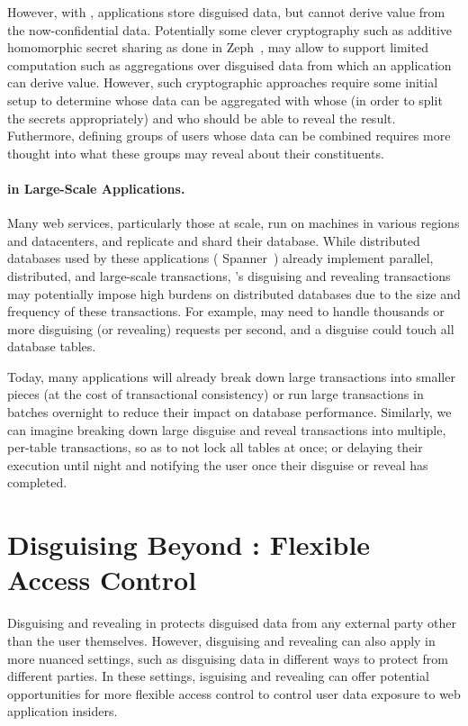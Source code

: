 However, with \sys, applications store disguised data, but cannot derive value
from the now-confidential data.
%
Potentially some clever cryptography such as additive homomorphic secret sharing
as done in Zeph~\cite{zeph}, may allow \sys to support limited computation such
as aggregations over disguised data from which an application can derive value.
%
However, such cryptographic approaches require some initial setup to determine
whose data can be aggregated with whose (in order to split the secrets
appropriately) and who should be able to reveal the result. Futhermore, defining
groups of users whose data can be combined requires more thought into what these
groups may reveal about their constituents.
%

\paragraph{\sys in Large-Scale Applications.}
Many web services, particularly those at scale, run on machines in various
regions and datacenters, and replicate and shard their database.
%
While distributed databases used by these applications (\eg
Spanner~\cite{spanner}) already implement parallel, distributed, and large-scale
transactions, \sys's disguising and revealing transactions may potentially
impose high burdens on distributed databases due to the size and frequency of
these transactions.
%
For example, \sys may need to handle thousands or more disguising (or
revealing) requests per second, and a disguise could touch all database tables.
%

%
Today, many applications will already break down large transactions into smaller
pieces (at the cost of transactional consistency) or run large transactions in
batches overnight to reduce their impact on database performance.
%
Similarly, we can imagine \sys breaking down large disguise and reveal transactions
into multiple, per-table transactions, so as to not lock all tables at once; or
delaying their execution until night and notifying the user once their
disguise or reveal has completed. 
%

\section{Disguising Beyond \sys: Flexible Access Control}
Disguising and revealing in \sys protects disguised data from any external party
other than the user themselves. However, disguising and revealing can also apply
in more nuanced settings, such as disguising data in different ways to 
protect from different parties. 
%
In these settings, isguising and revealing can offer potential opportunities for
more flexible access control to control user data exposure to web application
insiders.

